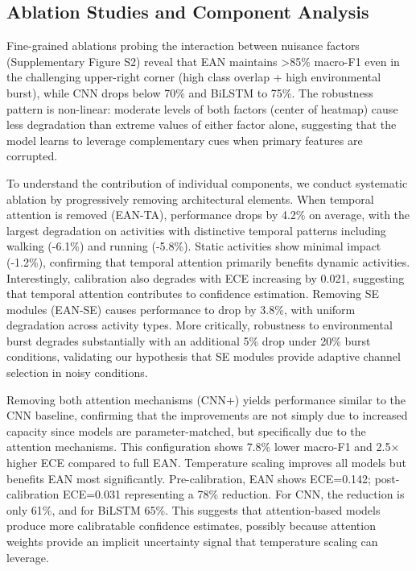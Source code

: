 \documentclass[lettersize,journal]{IEEEtran}
\begin{document}
\subsection{Ablation Studies and Component Analysis}

Fine-grained ablations probing the interaction between nuisance factors (Supplementary Figure S2) reveal that EAN maintains >85\% macro-F1 even in the challenging upper-right corner (high class overlap + high environmental burst), while CNN drops below 70\% and BiLSTM to 75\%. The robustness pattern is non-linear: moderate levels of both factors (center of heatmap) cause less degradation than extreme values of either factor alone, suggesting that the model learns to leverage complementary cues when primary features are corrupted.

To understand the contribution of individual components, we conduct systematic ablation by progressively removing architectural elements. When temporal attention is removed (EAN-TA), performance drops by 4.2\% on average, with the largest degradation on activities with distinctive temporal patterns including walking (-6.1\%) and running (-5.8\%). Static activities show minimal impact (-1.2\%), confirming that temporal attention primarily benefits dynamic activities. Interestingly, calibration also degrades with ECE increasing by 0.021, suggesting that temporal attention contributes to confidence estimation. Removing SE modules (EAN-SE) causes performance to drop by 3.8\%, with uniform degradation across activity types. More critically, robustness to environmental burst degrades substantially with an additional 5\% drop under 20\% burst conditions, validating our hypothesis that SE modules provide adaptive channel selection in noisy conditions.

Removing both attention mechanisms (CNN+) yields performance similar to the CNN baseline, confirming that the improvements are not simply due to increased capacity since models are parameter-matched, but specifically due to the attention mechanisms. This configuration shows 7.8\% lower macro-F1 and 2.5× higher ECE compared to full EAN. Temperature scaling improves all models but benefits EAN most significantly. Pre-calibration, EAN shows ECE=0.142; post-calibration ECE=0.031 representing a 78\% reduction. For CNN, the reduction is only 61\%, and for BiLSTM 65\%. This suggests that attention-based models produce more calibratable confidence estimates, possibly because attention weights provide an implicit uncertainty signal that temperature scaling can leverage.
\end{document}

